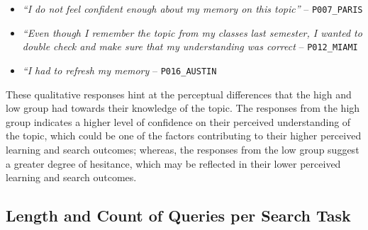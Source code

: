 \documentclass[letterpaper, nobind]{templates/ociamthesis}
\providecommand{\tightlist}{%
  \setlength{\itemsep}{0pt}\setlength{\parskip}{0pt}}
\begin{document}
\begin{itemize}
\tightlist
\item
  \emph{``I do not feel confident enough about my memory on this topic''} -- \texttt{P007\_PARIS}
\item
  \emph{``Even though I remember the topic from my classes last semester, I wanted to double check and make sure that my understanding was correct} -- \texttt{P012\_MIAMI}
\item
  \emph{``I had to refresh my memory} -- \texttt{P016\_AUSTIN}
\end{itemize}

These qualitative responses hint at the perceptual differences that the high and low group had towards their knowledge of the topic.
The responses from the high group indicates a higher level of confidence on their perceived understanding of the topic, which could be one of the factors contributing to their higher perceived learning and search outcomes;
whereas, the responses from the low group suggest a greater degree of hesitance, which may be reflected in their lower perceived learning and search outcomes.

\hypertarget{length-and-count-of-queries-per-search-task-1}{%
\subsection{Length and Count of Queries per Search Task}\label{length-and-count-of-queries-per-search-task-1}}
\end{document}
